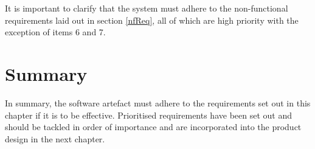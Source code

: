 It is important to clarify that the system must adhere to the non-functional requirements laid out in section \ref{nfReq}, all of which are high priority with the exception of items 6 and 7. \revisit

\section{Summary}
In summary, the software artefact must adhere to the requirements set out in this chapter if it is to be effective.  Prioritised requirements have been set out and should be tackled in order of importance and are incorporated into the product design in the next chapter. 
